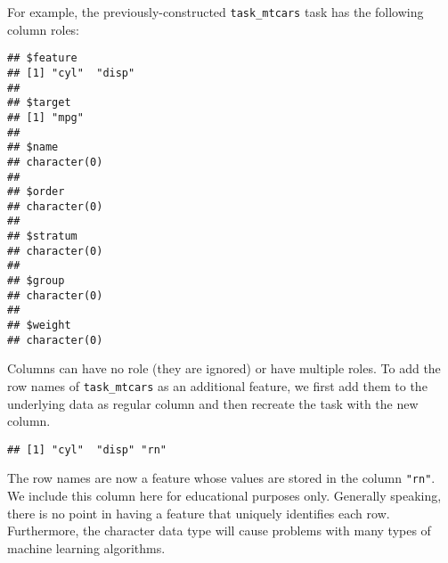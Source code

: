 \documentclass[
]{scrbook}
\newenvironment{Shaded}{\begin{snugshade}}{\end{snugshade}}
\newcommand{\AttributeTok}[1]{\textcolor[rgb]{0.77,0.63,0.00}{#1}}
\newcommand{\CommentTok}[1]{\textcolor[rgb]{0.56,0.35,0.01}{\textit{#1}}}
\newcommand{\ConstantTok}[1]{\textcolor[rgb]{0.00,0.00,0.00}{#1}}
\newcommand{\DecValTok}[1]{\textcolor[rgb]{0.00,0.00,0.81}{#1}}
\newcommand{\FunctionTok}[1]{\textcolor[rgb]{0.00,0.00,0.00}{#1}}
\newcommand{\NormalTok}[1]{#1}
\newcommand{\OtherTok}[1]{\textcolor[rgb]{0.56,0.35,0.01}{#1}}
\newcommand{\SpecialCharTok}[1]{\textcolor[rgb]{0.00,0.00,0.00}{#1}}
\newcommand{\StringTok}[1]{\textcolor[rgb]{0.31,0.60,0.02}{#1}}
\renewenvironment{Shaded} {\begin{snugshade}\small} {\end{snugshade}}
\begin{document}
For example, the previously-constructed \texttt{task\_mtcars} task has the following column roles:

\begin{Shaded}
\end{Shaded}

\begin{verbatim}
## $feature
## [1] "cyl"  "disp"
## 
## $target
## [1] "mpg"
## 
## $name
## character(0)
## 
## $order
## character(0)
## 
## $stratum
## character(0)
## 
## $group
## character(0)
## 
## $weight
## character(0)
\end{verbatim}

Columns can have no role (they are ignored) or have multiple roles.
To add the row names of \texttt{task\_mtcars} as an additional feature, we first add them to the underlying data as regular column and then recreate the task with the new column.

\begin{Shaded}
\end{Shaded}

\begin{verbatim}
## [1] "cyl"  "disp" "rn"
\end{verbatim}

The row names are now a feature whose values are stored in the column \texttt{"rn"}.
We include this column here for educational purposes only.
Generally speaking, there is no point in having a feature that uniquely identifies each row.
Furthermore, the character data type will cause problems with many types of machine learning algorithms.
\end{document}
